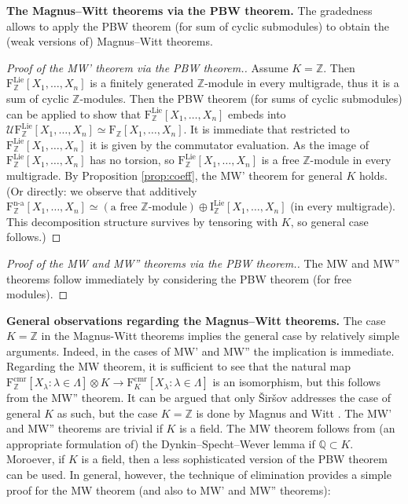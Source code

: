 \documentclass[11pt,a4paper]{amsart}
\DeclareMathOperator{\nonass}{n-a}
\DeclareMathOperator{\Lie}{Lie}
\DeclareMathOperator{\cmr}{cmr}
\theoremstyle{definition}
\theoremstyle{plain}
\begin{document}
\textbf{The Magnus--Witt theorems via the PBW theorem.}
The gradedness allows to apply the PBW theorem (for sum of cyclic submodules) to obtain the (weak versions of) Magnus--Witt theorems.
\begin{proof}[Proof of the MW' theorem via the PBW theorem.]
Assume $K=\mathbb Z$.
Then $\mathrm F^{\Lie}_{\mathbb Z}[X_1,\ldots,X_n]$ is a finitely generated $\mathbb Z$-module in every multigrade,
 thus it is a sum of cyclic $\mathbb Z$-modules.
Then the PBW theorem  (for sums of cyclic submodules) can be applied to show that
 $\mathrm F^{\Lie}_{\mathbb Z}[X_1,\ldots,X_n]$ embeds into $\mathcal U\mathrm F^{\Lie}_{\mathbb Z}[X_1,\ldots,X_n]\simeq \mathrm F^{}_{\mathbb Z}[X_1,\ldots,X_n]$.
It is immediate that restricted to $\mathrm F^{\Lie}_{\mathbb Z}[X_1,\ldots,X_n]$ it is given by the  commutator evaluation.
As the image of $\mathrm F^{\Lie}_{\mathbb Z}[X_1,\ldots,X_n]$ has no torsion, so
$\mathrm F^{\Lie}_{\mathbb Z}[X_1,\ldots,X_n]$ is a free $\mathbb Z$-module in every multigrade.
By Proposition \ref{prop:coeff}, the MW' theorem for general $K$ holds.
(Or directly: we observe that additively $\mathrm F^{\nonass}_{\mathbb Z}[X_1,\ldots,X_n]
 \simeq (\text{a free $\mathbb Z$-module})\oplus\mathrm I^{\Lie}_{\mathbb Z}[X_1,\ldots,X_n]$
(in every multigrade).
This decomposition structure survives by tensoring with $K$, so general case follows.)
\end{proof}
\begin{proof}[Proof of the MW and MW'' theorems via the PBW theorem.]
The MW and MW'' the\-o\-rems  follow immediately by considering the PBW theorem (for free modules).
\end{proof}

\textbf{General observations regarding the Magnus--Witt theorems.}
The case $K=\mathbb Z$ in the Magnus-Witt theorems implies the general case by relatively simple arguments.
Indeed, in the cases of MW' and MW'' the implication is immediate.
Regarding the MW theorem, it is sufficient to see that the natural map
 $\mathrm F^{\cmr}_{\mathbb Z}[X_\lambda:\lambda\in\Lambda]\otimes K\rightarrow\mathrm F^{\cmr}_K[X_\lambda:\lambda\in\Lambda]$
 is an isomorphism, but this follows from the MW'' theorem.
It can be argued that only \v{S}ir\v{s}ov \cite{S2} addresses the case of general $K$ as such,
 but the case $K=\mathbb Z$ is done by Magnus \cite{MM} and Witt \cite{W}.
The MW' and MW'' theorems are trivial if $K$ is a field.
The MW theorem follows from (an appropriate formulation of) the Dynkin--Specht--Wever lemma if $\mathbb Q\subset K$.
Moroever, if $K$ is a field, then a less sophisticated version of the PBW theorem can be used.
In general, however, the technique of elimination provides a simple proof for
 the MW theorem (and also to MW' and MW'' theorems):
\end{document}
